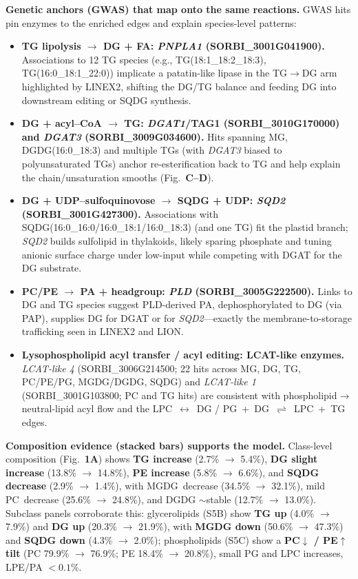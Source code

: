 \documentclass[10pt,letterpaper]{article}
\begin{document}
\noindent \textbf{Genetic anchors (GWAS) that map onto the same reactions.}
GWAS hits pin enzymes to the enriched edges and explain species-level patterns:
\begin{itemize}\itemsep3pt
  \item \textbf{TG lipolysis $\rightarrow$ DG + FA: \textit{PNPLA1} (SORBI\_3001G041900).} Associations to 12 TG species (e.g., TG(18:1\_18:2\_18:3), TG(16:0\_18:1\_22:0)) implicate a patatin-like lipase in the TG$\rightarrow$DG arm highlighted by LINEX2, shifting the DG/TG balance and feeding DG into downstream editing or SQDG synthesis.
  \item \textbf{DG + acyl–CoA $\rightarrow$ TG: \textit{DGAT1}/TAG1 (SORBI\_3010G170000) and \textit{DGAT3} (SORBI\_3009G034600).} Hits spanning MG, DGDG(16:0\_18:3) and multiple TGs (with \textit{DGAT3} biased to polyunsaturated TGs) anchor re-esterification back to TG and help explain the chain/unsaturation smooths (Fig.\ \textbf{C–D}).
  \item \textbf{DG + UDP–sulfoquinovose $\rightarrow$ SQDG + UDP: \textit{SQD2} (SORBI\_3001G427300).} Associations with SQDG(16:0\_16:0/16:0\_18:1/16:0\_18:3) (and one TG) fit the plastid branch; \textit{SQD2} builds sulfolipid in thylakoids, likely sparing phosphate and tuning anionic surface charge under low-input while competing with DGAT for the DG substrate.
  \item \textbf{PC/PE $\rightarrow$ PA + headgroup: \textit{PLD} (SORBI\_3005G222500).} Links to DG and TG species suggest PLD-derived PA, dephosphorylated to DG (via PAP), supplies DG for DGAT or for \textit{SQD2}—exactly the membrane-to-storage trafficking seen in LINEX2 and LION.
  \item \textbf{Lysophospholipid acyl transfer / acyl editing: LCAT-like enzymes.} 
  \textit{LCAT-like 4} (SORBI\_3006G214500; 22 hits across MG, DG, TG, PC/PE/PG, MGDG/DGDG, SQDG) and \textit{LCAT-like 1} (SORBI\_3001G103800; PC and TG hits) are consistent with phospholipid$\rightarrow$neutral-lipid acyl flow and the \mbox{LPC $\leftrightarrow$ DG} / \mbox{PG + DG $\rightleftharpoons$ LPC + TG} edges.
\end{itemize}

\noindent \textbf{Composition evidence (stacked bars) supports the model.}
Class-level composition (Fig.\ \textbf{1A}) shows \textbf{TG increase} (2.7\% $\rightarrow$ 5.4\%), \textbf{DG slight increase} (13.8\% $\rightarrow$ 14.8\%), \textbf{PE increase} (5.8\% $\rightarrow$ 6.6\%), and \textbf{SQDG decrease} (2.9\% $\rightarrow$ 1.4\%), with \mbox{MGDG decrease} (34.5\% $\rightarrow$ 32.1\%), mild \mbox{PC decrease} (25.6\% $\rightarrow$ 24.8\%), and DGDG $\sim$stable (12.7\% $\rightarrow$ 13.0\%). 
Subclass panels corroborate this: glycerolipids (S5B) show \textbf{TG up} (4.0\% $\rightarrow$ 7.9\%) and \textbf{DG up} (20.3\% $\rightarrow$ 21.9\%), with \textbf{MGDG down} (50.6\% $\rightarrow$ 47.3\%) and \textbf{SQDG down} (4.3\% $\rightarrow$ 2.0\%); phospholipids (S5C) show a \textbf{PC$\downarrow$ / PE$\uparrow$ tilt} (PC 79.9\% $\rightarrow$ 76.9\%; PE 18.4\% $\rightarrow$ 20.8\%), small PG and LPC increases, LPE/PA $<0.1\%$.
\end{document}
